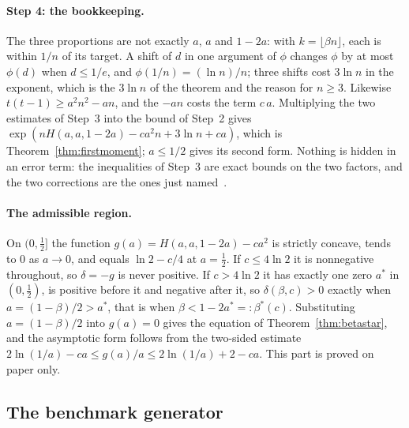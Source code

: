\paragraph{Step 4: the bookkeeping.}
The three proportions are not exactly $a$, $a$ and $1-2a$: with
$k=\lfloor\beta n\rfloor$, each is within $1/n$ of its target. A shift of $d$
in one argument of $\phi$ changes $\phi$ by at most $\phi(d)$ when $d\le1/e$,
and $\phi(1/n)=(\ln n)/n$; three shifts cost $3\ln n$ in the exponent, which
is the $3\ln n$ of the theorem and the reason for $n\ge3$. Likewise
$t(t-1)\ge a^{2}n^{2}-an$, and the $-an$ costs the term $c\,a$. Multiplying
the two estimates of Step~3 into the bound of Step~2 gives
$\exp(nH(a,a,1-2a)-ca^{2}n+3\ln n+ca)$, which is Theorem~\ref{thm:firstmoment};
$a\le1/2$ gives its second form. Nothing is hidden in an error term: the
inequalities of Step~3 are exact bounds on the two factors, and the two
corrections are the ones just named~.

\paragraph{The admissible region.}
On $(0,\tfrac12]$ the function $g(a)=H(a,a,1-2a)-ca^{2}$ is strictly concave,
tends to $0$ as $a\to0$, and equals $\ln2-c/4$ at $a=\tfrac12$. If
$c\le4\ln2$ it is nonnegative throughout, so $\delta=-g$ is never positive.
If $c>4\ln2$ it has exactly one zero $a^{*}$ in $(0,\tfrac12)$, is positive
before it and negative after it, so $\delta(\beta,c)>0$ exactly when
$a=(1-\beta)/2>a^{*}$, that is when $\beta<1-2a^{*}=:\beta^{*}(c)$.
Substituting $a=(1-\beta)/2$ into $g(a)=0$ gives the equation of
Theorem~\ref{thm:betastar}, and the asymptotic form follows from the
two-sided estimate $2\ln(1/a)-ca\le g(a)/a\le2\ln(1/a)+2-ca$. This part is
proved on paper only.

\subsection{The benchmark generator}
\label{app:random-cs}

